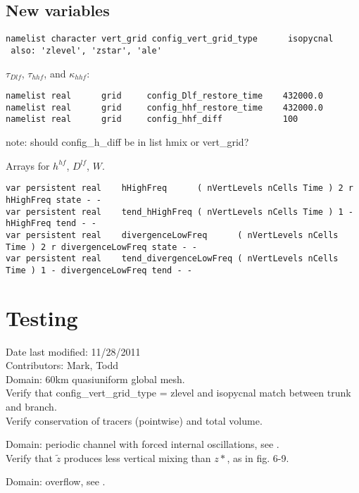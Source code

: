 \documentclass[11pt]{report}
\begin{document}
\section{New variables}

\begin{verbatim}
namelist character vert_grid config_vert_grid_type      isopycnal
 also: 'zlevel', 'zstar', 'ale'
\end{verbatim}
$\tau_{Dlf}$, $\tau_{hhf}$, and $\kappa_{hhf}$:
\begin{verbatim}
namelist real      grid     config_Dlf_restore_time    432000.0
namelist real      grid     config_hhf_restore_time    432000.0
namelist real      grid     config_hhf_diff            100
\end{verbatim}
note: should config\_h\_diff be in list hmix or vert\_grid?

Arrays for $h^{hf}$, $D^{lf}$, $W$.
\begin{verbatim}
var persistent real    hHighFreq      ( nVertLevels nCells Time ) 2 r hHighFreq state - -
var persistent real    tend_hHighFreq ( nVertLevels nCells Time ) 1 - hHighFreq tend - -
var persistent real    divergenceLowFreq      ( nVertLevels nCells Time ) 2 r divergenceLowFreq state - -
var persistent real    tend_divergenceLowFreq ( nVertLevels nCells Time ) 1 - divergenceLowFreq tend - -
\end{verbatim}


\chapter{Testing}
Date last modified: 11/28/2011 \\
Contributors: Mark, Todd \\

Domain: 60km quasiuniform global mesh.\\
Verify that config\_vert\_grid\_type = zlevel and isopycnal match between trunk and branch.\\
Verify conservation of tracers (pointwise) and total volume.

Domain: periodic channel with forced internal oscillations, see \cite{Leclair:2011ud}.\\
Verify that ${\tilde z}$ produces less vertical mixing than $z*$, as in fig. 6-9.


Domain: overflow, see \cite{Adcroft:2004tv}.




%


\end{document}

